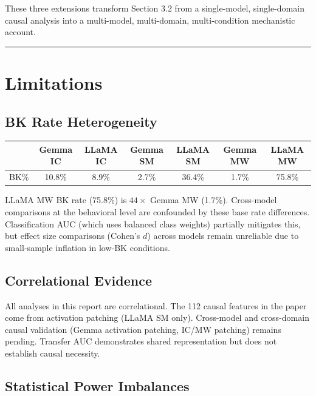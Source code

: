\documentclass[11pt,a4paper]{article}
\begin{document}
\medskip\noindent These three extensions transform Section 3.2 from a single-model, single-domain causal analysis into a multi-model, multi-domain, multi-condition mechanistic account.

\bigskip\hrule\bigskip

\section{Limitations}

\subsection{BK Rate Heterogeneity}

\begin{table}[H]
\centering
\footnotesize
\begin{tabular}{lcccccc}
\toprule
 & Gemma IC & LLaMA IC & Gemma SM & LLaMA SM & Gemma MW & LLaMA MW \\
\midrule
BK\% & 10.8\% & 8.9\% & 2.7\% & 36.4\% & 1.7\% & 75.8\% \\
\bottomrule
\end{tabular}
\end{table}

\noindent LLaMA MW BK rate (75.8\%) is $44\times$ Gemma MW (1.7\%). Cross-model comparisons at the behavioral level are confounded by these base rate differences. Classification AUC (which uses balanced class weights) partially mitigates this, but effect size comparisons (Cohen's $d$) across models remain unreliable due to small-sample inflation in low-BK conditions.

\subsection{Correlational Evidence}

All analyses in this report are correlational. The 112 causal features in the paper come from activation patching (LLaMA SM only). Cross-model and cross-domain causal validation (Gemma activation patching, IC/MW patching) remains pending. Transfer AUC demonstrates shared representation but does not establish causal necessity.

\subsection{Statistical Power Imbalances}
\end{document}
